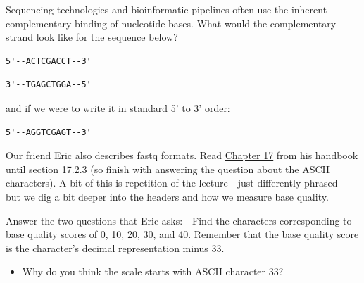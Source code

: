\documentclass[
  letterpaper,
  DIV=11,
  numbers=noendperiod]{scrreprt}
\providecommand{\tightlist}{%
  \setlength{\itemsep}{0pt}\setlength{\parskip}{0pt}}\usepackage{longtable,booktabs,array}
\begin{document}
Sequencing technologies and bioinformatic pipelines often use the
inherent complementary binding of nucleotide bases. What would the
complementary strand look like for the sequence below?

\begin{verbatim}
5'--ACTCGACCT--3'
\end{verbatim}

\begin{tcolorbox}[enhanced jigsaw, arc=.35mm, left=2mm, titlerule=0mm, rightrule=.15mm, colframe=quarto-callout-tip-color-frame, coltitle=black, colback=white, opacityback=0, bottomtitle=1mm, bottomrule=.15mm, colbacktitle=quarto-callout-tip-color!10!white, breakable, title=\textcolor{quarto-callout-tip-color}{\faLightbulb}\hspace{0.5em}{Answer}, toptitle=1mm, toprule=.15mm, opacitybacktitle=0.6, leftrule=.75mm]

\begin{verbatim}
3'--TGAGCTGGA--5' 
\end{verbatim}

and if we were to write it in standard 5' to 3' order:

\begin{verbatim}
5'--AGGTCGAGT--3'
\end{verbatim}

\end{tcolorbox}

Our friend Eric also describes fastq formats. Read
\href{https://eriqande.github.io/eca-bioinf-handbook/bioinformatic-file-formats.html\#bioinformatic-file-formats}{Chapter
17} from his handbook until section 17.2.3 (so finish with answering the
question about the ASCII characters). A bit of this is repetition of the
lecture - just differently phrased - but we dig a bit deeper into the
headers and how we measure base quality.

Answer the two questions that Eric asks: - Find the characters
corresponding to base quality scores of 0, 10, 20, 30, and 40. Remember
that the base quality score is the character's decimal representation
minus 33.

\begin{itemize}
\tightlist
\item
  Why do you think the scale starts with ASCII character 33?
\end{itemize}
\end{document}
